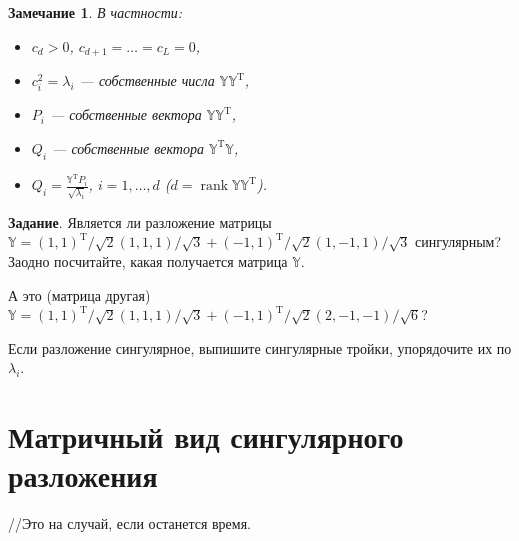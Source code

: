 \documentclass[specialist, 12pt,
subf, %
href, colorlinks=true,
substylefile = spbu.rtx,
]{disser}
\newtheorem{remark}{Замечание}
\DeclareMathOperator{\rnk}{rank}
\begin{document}
\begin{remark}
	В частности:
	\begin{itemize}
	\item $c_d > 0$, $c_{d+1} = \ldots = c_L = 0$,
	\item $c_i^2 = \lambda_i$ --- собственные числа $\mathbb{Y}\mathbb{Y}^{\mathrm{T}}$,
	\item $P_i$ --- собственные вектора $\mathbb{Y}\mathbb{Y}^{\mathrm{T}}$,
	\item $Q_i$ --- собственные вектора $\mathbb{Y}^{\mathrm{T}}\mathbb{Y}$,
	\item $Q_i = \frac{\mathbb{Y}^{\mathrm{T}} P_i}{\sqrt{\lambda_i}}$, $i = 1,\ldots,d$ ($d = \rnk\mathbb{Y}\mathbb{Y}^\mathrm{T}$).
	\end{itemize}
\end{remark}


\textbf{Задание}. Является ли разложение матрицы $\mathbb{Y} = (1,1)^\mathrm{T}/\sqrt{2} (1,1,1)/\sqrt{3} + (-1,1)^\mathrm{T}/\sqrt{2} (1,-1,1)/\sqrt{3}$ сингулярным? Заодно посчитайте, какая получается матрица $\mathbb{Y}$.

А это (матрица другая)
$\mathbb{Y} = (1,1)^\mathrm{T}/\sqrt{2} (1,1,1)/\sqrt{3} + (-1,1)^\mathrm{T}/\sqrt{2} (2,-1,-1)/\sqrt{6}$?

Если разложение сингулярное, выпишите сингулярные тройки, упорядочите их по $\lambda_i$.

\section{Матричный вид сингулярного разложения}
//Это на случай, если останется время.
\end{document}
